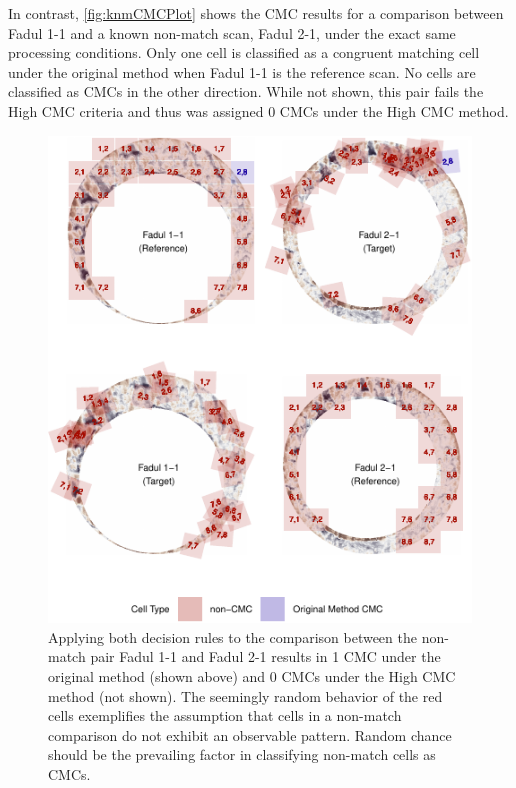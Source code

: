 In contrast, \autoref{fig:knmCMCPlot} shows the CMC results for a
comparison between Fadul 1-1 and a known non-match scan, Fadul 2-1,
under the exact same processing conditions. Only one cell is classified
as a congruent matching cell under the original method when Fadul 1-1 is
the reference scan. No cells are classified as CMCs in the other
direction. While not shown, this pair fails the High CMC criteria and
thus was assigned 0 CMCs under the High CMC method.

\begin{Schunk}
\begin{figure}[htbp]

{\centering \includegraphics[width=\textwidth]{figures/knmOriginalMethod}

}

\caption{\label{fig:knmCMCPlot} Applying both decision rules to the comparison between the non-match pair Fadul 1-1 and Fadul 2-1 results in 1 CMC under the original method (shown above) and 0 CMCs under the High CMC method (not shown). The seemingly random behavior of the red cells exemplifies the assumption that cells in a non-match comparison do not exhibit an observable pattern. Random chance should be the prevailing factor in classifying non-match cells as CMCs.}\label{fig:unnamed-chunk-18}
\end{figure}
\end{Schunk}

